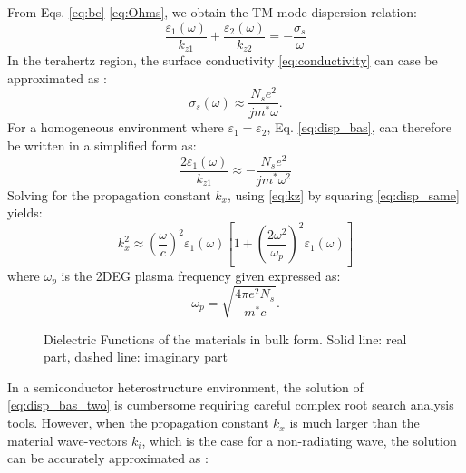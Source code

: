 \documentclass[conference, 10pt]{IEEEtran}
\renewcommand{\O}{\omega}  %
\newcommand{\E}{\varepsilon}  %
\renewcommand{\^}{\hat}  %
\begin{document}
From Eqs. \eqref{eq:bc}-\eqref{eq:Ohms}, we obtain the TM mode dispersion relation:
%
\begin{equation}
  \frac{\E_1(\O)}{k_{z1}} + \frac{\E_2(\O)}{k_{z2}} = -\frac{\sigma_s}{\O}
  \label{eq:disp_bas_two}
\end{equation}
%
In the terahertz region, the surface conductivity \eqref{eq:conductivity} can case be approximated as \cite{stern1967polarizability}:
%
\begin{equation}
  \sigma_s(\O) \approx \frac{N_s e^2}{j m^{\ast}\O}.
  \label{eq:conductivity_app}
\end{equation}
%
For a homogeneous environment where $\E_1 = \E_2$, Eq. \eqref{eq:disp_bas}, can therefore be written in a simplified form as:
%
\begin{equation}
  \frac{2 \E_1(\O)}{k_{z1}} \approx -\frac{N_s e^2}{j m^{\ast}\O^2}
  \label{eq:disp_same}
\end{equation}
%
Solving for the propagation constant $k_x$, using \eqref{eq:kz} by squaring \eqref{eq:disp_same} yields:
\begin{equation}
  k_x^2 \approx \left(\frac{\O}{c}\right)^2 \E_1(\O) \left[1 + \left(\frac{2 \O^2}{\O_p}\right)^2 \E_1(\O) \right]
  \label{eq:disp_same_final}
\end{equation}
%
where $\O_p$ is the 2DEG plasma frequency given expressed as:
%
\begin{equation}
  \O_{p} =  \sqrt{\frac{4 \pi e^2 N_s} {m^{\ast} c }}.
  \label{eq:plasma_f}
\end{equation}
%
\begin{figure*}[!t]
\centering
\subfloat[Case A]{
\label{fig:eps_Ga}}
\hfil
\subfloat[Case B]{
\label{fig:eps_Sto}}
  \caption{Dielectric Functions of the materials in bulk form. Solid line: real part, dashed line: imaginary part}
\label{fig:eps}
\end{figure*}
%
In a semiconductor heterostructure environment, the solution of \eqref{eq:disp_bas_two} is cumbersome requiring careful complex root search analysis tools. However, when the propagation constant $k_x$ is much larger than the material wave-vectors $k_i$, which is the case for a non-radiating wave, the solution can be accurately approximated as \cite{jablan2009plasmonics}:
\end{document}
